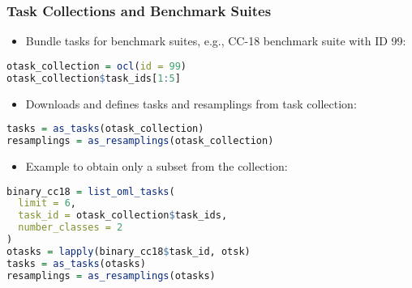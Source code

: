\documentclass[10pt,compress,t,notes=noshow, xcolor=table]{beamer}
\begin{document}
\begin{frame}[fragile]
\frametitle{Task Collections and Benchmark Suites}
\begin{itemize}
  \item Bundle tasks for benchmark suites, e.g., CC-18 benchmark suite with ID 99:
\end{itemize}
\begin{lstlisting}[language=R]
otask_collection = ocl(id = 99)
otask_collection$task_ids[1:5]
\end{lstlisting}
\begin{itemize}
  \item Downloads and defines tasks and resamplings from task collection:
\end{itemize}
\begin{lstlisting}[language=R]
tasks = as_tasks(otask_collection)
resamplings = as_resamplings(otask_collection)
\end{lstlisting}

\begin{itemize}
  \item Example to obtain only a subset from the collection:
\end{itemize}
\begin{lstlisting}[language=R]
binary_cc18 = list_oml_tasks(
  limit = 6,
  task_id = otask_collection$task_ids,
  number_classes = 2
)
otasks = lapply(binary_cc18$task_id, otsk)
tasks = as_tasks(otasks)
resamplings = as_resamplings(otasks)
\end{lstlisting}
\end{frame}




\endlecture
\end{document}
